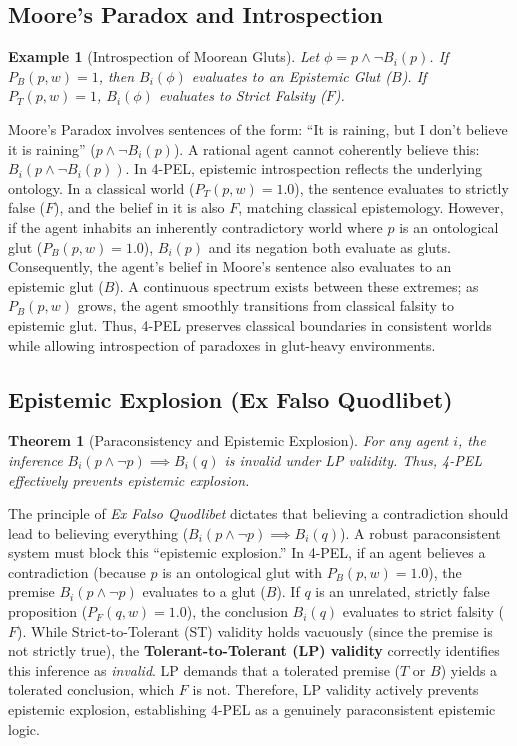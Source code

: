 \documentclass[11pt,a4paper]{article}
\newtheorem{theorem}{Theorem}[section]
\newtheorem{example}{Example}[section]
\begin{document}
\subsection{Moore's Paradox and Introspection}
\begin{example}[Introspection of Moorean Gluts]
Let $\phi = p \land \neg B_i(p)$. If $P_B(p, w) = 1$, then $B_i(\phi)$ evaluates to an Epistemic Glut ($B$). If $P_T(p, w) = 1$, $B_i(\phi)$ evaluates to Strict Falsity ($F$).
\end{example}
Moore's Paradox involves sentences of the form: ``It is raining, but I don't believe it is raining'' ($p \land \neg B_i(p)$). A rational agent cannot coherently believe this: $B_i(p \land \neg B_i(p))$.
In 4-PEL, epistemic introspection reflects the underlying ontology. In a classical world ($P_T(p, w) = 1.0$), the sentence evaluates to strictly false ($F$), and the belief in it is also $F$, matching classical epistemology. However, if the agent inhabits an inherently contradictory world where $p$ is an ontological glut ($P_B(p, w) = 1.0$), $B_i(p)$ and its negation both evaluate as gluts. Consequently, the agent's belief in Moore's sentence also evaluates to an epistemic glut ($B$). A continuous spectrum exists between these extremes; as $P_B(p, w)$ grows, the agent smoothly transitions from classical falsity to epistemic glut. Thus, 4-PEL preserves classical boundaries in consistent worlds while allowing introspection of paradoxes in glut-heavy environments.

\subsection{Epistemic Explosion (Ex Falso Quodlibet)}
\begin{theorem}[Paraconsistency and Epistemic Explosion]
For any agent $i$, the inference $B_i(p \land \neg p) \implies B_i(q)$ is invalid under LP validity. Thus, 4-PEL effectively prevents epistemic explosion.
\end{theorem}
The principle of \textit{Ex Falso Quodlibet} dictates that believing a contradiction should lead to believing everything ($B_i(p \land \neg p) \implies B_i(q)$). A robust paraconsistent system must block this ``epistemic explosion.''
In 4-PEL, if an agent believes a contradiction (because $p$ is an ontological glut with $P_B(p, w) = 1.0$), the premise $B_i(p \land \neg p)$ evaluates to a glut ($B$). If $q$ is an unrelated, strictly false proposition ($P_F(q, w) = 1.0$), the conclusion $B_i(q)$ evaluates to strict falsity ($F$). 
While Strict-to-Tolerant (ST) validity holds vacuously (since the premise is not strictly true), the \textbf{Tolerant-to-Tolerant (LP) validity} correctly identifies this inference as \textit{invalid}. LP demands that a tolerated premise ($T$ or $B$) yields a tolerated conclusion, which $F$ is not. Therefore, LP validity actively prevents epistemic explosion, establishing 4-PEL as a genuinely paraconsistent epistemic logic.
\end{document}
